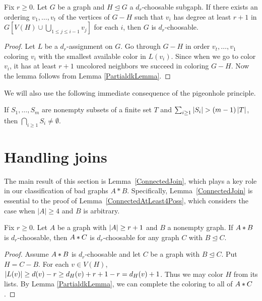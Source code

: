 \begin{lem}\label{ColorableSubgraphdk}
Fix $r \geq 0$. Let $G$ be a graph and $H \unlhd G$ a $d_r$-choosable subgaph.  If there exists an ordering $v_1, \ldots, v_t$ of the vertices of $G - H$
such that $v_i$ has degree at least $r+1$ in $G[V(H) \cup \bigcup_{1 \leq j \leq i - 1} v_j]$ for each $i$, then $G$ is $d_r$-choosable.
\end{lem}
\begin{proof}
Let $L$ be a $d_r$-assignment on $G$. Go through $G-H$ in order $v_t, \ldots, v_1$ coloring $v_i$ with the smallest available color in $L(v_i)$.  Since when we go to color $v_i$, it has at least $r+1$ uncolored neighbors we succeed in coloring $G-H$.  Now the lemma follows from Lemma \ref{PartialdkLemma}.
\end{proof}

We will also use the following immediate consequence of the pigeonhole principle.

\begin{lem}\label{BasicFiniteSets}
If $S_1, \ldots, S_m$ are nonempty subsets of a finite set $T$ and $\sum_{i \geq 1} \left|S_i\right| > (m - 1)\left|T\right|$, then $\bigcap_{i \geq 1} S_i \neq \emptyset$.
\end{lem}


\section{Handling joins}
The main result of this section is Lemma~\ref{ConnectedJoin}, which
plays a key role in our classification of bad graphs $A*B$.  Specifically,
Lemma~\ref{ConnectedJoin} is essential to the proof of
Lemma~\ref{ConnectedAtLeast4Poss}, which considers the case when $|A|\ge 4$ and
$B$ is arbitrary.

\begin{lem}\label{ArbitrarySubgraphLemma}
Fix $r \geq 0$. Let $A$ be a graph with $\left|A\right| \geq r + 1$ and $B$ a nonempty graph.  If $A \mbox{\hspace{2 pt}$\ast$\hspace{2 pt}} B$ is $d_r$-choosable, then $A \mbox{\hspace{2 pt}$\ast$\hspace{2 pt}} C$ is 
$d_r$-choosable for any graph $C$ with $B \unlhd C$.
\end{lem}
\begin{proof}
Assume $A \mbox{\hspace{2 pt}$\ast$\hspace{2 pt}} B$ is $d_r$-choosable and let $C$ be a graph with $B \unlhd C$.  Put $H = C - B$.  For each $v \in V(H)$, 
$\left|L(v)\right| \geq d(v) - r \geq d_H(v) + r + 1 - r = d_H(v) + 1$.  Thus we may color $H$ from its lists.  By Lemma \ref{PartialdkLemma}, we can complete the coloring to all of $A \mbox{\hspace{2 pt}$\ast$\hspace{2 pt}} C$.
\end{proof}

